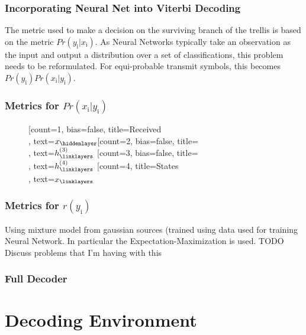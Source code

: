 \documentclass[10pt,tgadventor, onlymath]{beamer}
\begin{document}
\begin{frame}
	\frametitle{Incorporating Neural Net into Viterbi Decoding}
	The metric used to make a decision on the surviving branch of the trellis is based on the metric 
	$Pr(y_{\mathrm{i}}|x_{\mathrm{i}})$. As Neural Networks typically take an observation as the input and output a distribution over a set of classifications, this problem needs to be reformulated.
	For equi-probable transmit symbols, this becomes $Pr(y_{\mathrm{i}}) Pr(x_{\mathrm{i}}|y_{\mathrm{i}})$.
	
\end{frame}


\begin{frame}[fragile]
	\frametitle{Metrics for $Pr(x_{\mathrm{i}}|y_{\mathrm{i}})$}
	\begin{figure}
		\begin{neuralnetwork}[height=4, nodespacing=10mm, layerspacing=15mm]
		\newcommand{\x}[2]{$x_#2$}
		\newcommand{\y}[2]{$\hat{y}_#2$}
		\newcommand{\hfirst}[2]{\small $h^{(1)}_#2$}
		\newcommand{\hsecond}[2]{\small $h^{(2)}_#2$}
		\newcommand{\hthird}[2]{\small $h^{(3)}_#2$}
		\newcommand{\hfourth}[2]{\small $h^{(4)}_#2$}
		[count=1, bias=false, title=Received\\, text=\x]
		\hiddenlayer[count=2, bias=false, title=\\, text=\hthird] \linklayers
		\hiddenlayer[count=3, bias=false, title=\\, text=\hfourth] \linklayers
		\outputlayer[count=4, title=States\\, text=\x] \linklayers
	    \end{neuralnetwork}
	\end{figure}
\end{frame}


\begin{frame}
	\frametitle{Metrics for $r(y_{\mathrm{i}})$}
	Using mixture model from gaussian sources (trained using data used for training Neural Network.
	In particular the Expectation-Maximization is used.
	TODO Discuss problems that I'm having with this
\end{frame}


\begin{frame}
	\frametitle{Full Decoder}
		
\end{frame}


\section{Decoding Environment}
\end{document}

